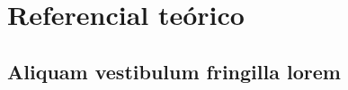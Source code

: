 

\chapter{Referencial teórico}\label{cap_trabalho_academico}

\section{Aliquam vestibulum fringilla lorem}

\lipsum[1]

\lipsum[2-3]